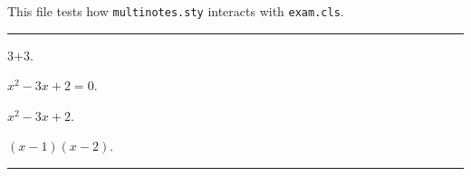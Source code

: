 \documentclass{exam}
\title{\cym{Arholiad}\eng{Exam}}
\date{\cym{\today}\eng{\today}}
\begin{document}
\maketitle

This file tests how \verb+multinotes.sty+ interacts with \verb+exam.cls+.

\bigskip\hrule\bigskip


\begin{questions}

\question[2] 
 3+3. \droppoints
{}

\question[3]
 $x^2-3x+2=0$. \droppoints
{}

\question[4] 
 $x^2-3x+2$. \droppoints
\begin{answer}
$(x-1)(x-2)$.
\end{answer}

\end{questions}

\hrule
\end{document}
